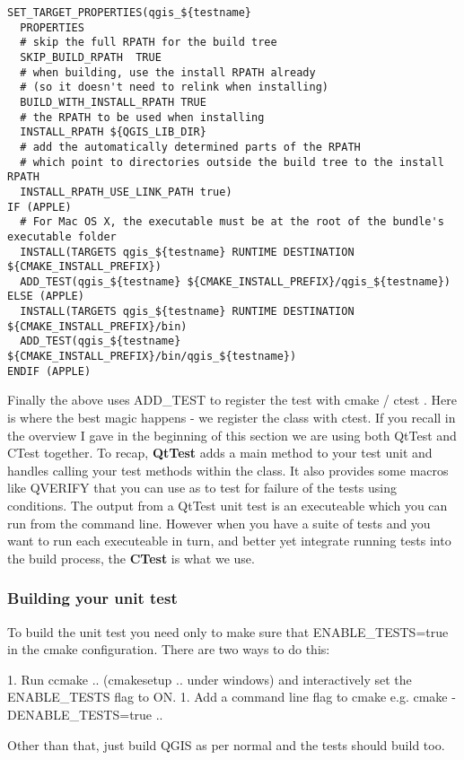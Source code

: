 \begin{verbatim}
SET_TARGET_PROPERTIES(qgis_${testname}
  PROPERTIES
  # skip the full RPATH for the build tree
  SKIP_BUILD_RPATH  TRUE
  # when building, use the install RPATH already
  # (so it doesn't need to relink when installing)
  BUILD_WITH_INSTALL_RPATH TRUE
  # the RPATH to be used when installing
  INSTALL_RPATH ${QGIS_LIB_DIR}
  # add the automatically determined parts of the RPATH
  # which point to directories outside the build tree to the install RPATH
  INSTALL_RPATH_USE_LINK_PATH true)
IF (APPLE)
  # For Mac OS X, the executable must be at the root of the bundle's executable folder
  INSTALL(TARGETS qgis_${testname} RUNTIME DESTINATION ${CMAKE_INSTALL_PREFIX})
  ADD_TEST(qgis_${testname} ${CMAKE_INSTALL_PREFIX}/qgis_${testname})
ELSE (APPLE)
  INSTALL(TARGETS qgis_${testname} RUNTIME DESTINATION ${CMAKE_INSTALL_PREFIX}/bin)
  ADD_TEST(qgis_${testname} ${CMAKE_INSTALL_PREFIX}/bin/qgis_${testname})
ENDIF (APPLE)
\end{verbatim}

Finally the above uses ADD\_TEST to register the test with cmake / ctest . Here
is where the best magic happens - we register the class with ctest. If you
recall in the overview I gave in the beginning of this section we are using
both QtTest and CTest together. To recap, \textbf{QtTest} adds a main method to your
test unit and handles calling your test methods within the class. It also
provides some macros like QVERIFY that you can use as to test for failure of
the tests using conditions. The output from a QtTest unit test is an
executeable which you can run from the command line.  However when you have a
suite of tests and you want to run each executeable in turn, and better yet
integrate running tests into the build process, the \textbf{CTest} is what we use. 

\subsubsection{Building your unit test}
To build the unit test you need only to make sure that ENABLE\_TESTS=true in the
cmake configuration. There are two ways to do this:

 1. Run ccmake .. (cmakesetup .. under windows) and interactively set 
 the ENABLE\_TESTS flag to ON.
 1. Add a command line flag to cmake e.g. cmake -DENABLE\_TESTS=true ..

Other than that, just build QGIS as per normal and the tests should build too.

